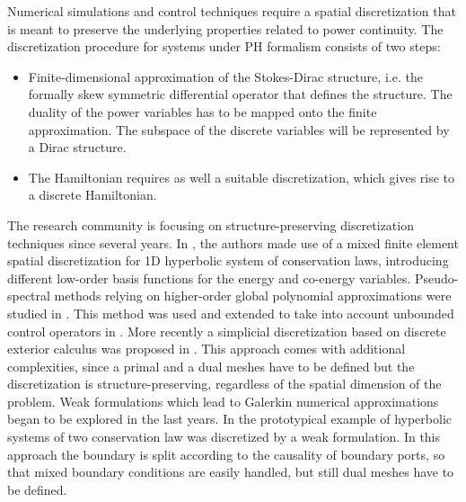 \documentclass[preprint,12pt]{elsarticle}
\begin{document}
	Numerical simulations and control techniques require a spatial discretization that is meant to preserve the underlying properties related to power continuity. The discretization procedure for systems under PH formalism consists of two steps:
	\begin{itemize}
		\item Finite-dimensional approximation of the Stokes-Dirac structure, i.e. the formally skew symmetric differential operator that defines the structure. The duality of the power variables has to be mapped onto the finite approximation. The subspace of the discrete variables will be represented by a Dirac structure. 
		\item The Hamiltonian requires as well a suitable discretization, which gives rise to a discrete Hamiltonian. 
	\end{itemize} 
	
	The research community is focusing on structure-preserving discretization techniques since several years. In \cite{Golo}, the authors made use of a mixed finite element spatial discretization for 1D hyperbolic system of conservation laws, introducing different low-order basis functions for the energy and co-energy variables. Pseudo-spectral methods relying on higher-order global polynomial approximations were studied in \cite{moulla:hal-01625008}. This method was used and extended to take into account unbounded control operators in \cite{articleFlavio}. More recently a simplicial discretization based on discrete exterior calculus was proposed in \cite{SESLIJA20121509}. This approach comes with additional complexities, since a primal and a dual meshes have to be defined but the discretization is structure-preserving, regardless of the spatial dimension of the problem. Weak formulations which lead to Galerkin numerical approximations began to be explored in the last years. In \cite{WeakForm_Kot} the prototypical example of hyperbolic systems of two conservation law was discretized by a weak formulation. In this approach the boundary is split according to the causality of boundary ports, so that mixed boundary conditions are easily handled, but still dual meshes have to be defined.  \\
	
\end{document}
